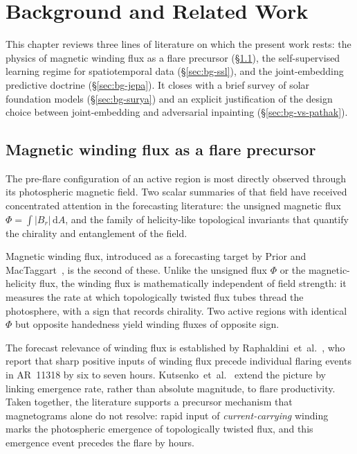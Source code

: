 \chapter{Background and Related Work}
\label{ch:background}

This chapter reviews three lines of literature on which the present
work rests: the physics of magnetic winding flux as a flare
precursor (\S\ref{sec:bg-winding}), the self-supervised learning
regime for spatiotemporal data (\S\ref{sec:bg-ssl}), and the
joint-embedding predictive doctrine
(\S\ref{sec:bg-jepa}). It closes with a brief survey of solar
foundation models (\S\ref{sec:bg-surya}) and an explicit
justification of the design choice between joint-embedding and
adversarial inpainting (\S\ref{sec:bg-vs-pathak}).

\section{Magnetic winding flux as a flare precursor}
\label{sec:bg-winding}

The pre-flare configuration of an active region is most directly
observed through its photospheric magnetic field. Two scalar
summaries of that field have received concentrated attention in the
forecasting literature: the unsigned magnetic flux $\Phi = \int
|B_{r}| \, \mathrm{d}A$, and the family of helicity-like topological
invariants that quantify the chirality and entanglement of the field.

Magnetic winding flux, introduced as a forecasting target by Prior
and MacTaggart~\cite{prior2020helicity}, is the second of these.
Unlike the unsigned flux $\Phi$ or the magnetic-helicity flux, the
winding flux is mathematically independent of field strength: it
measures the rate at which topologically twisted flux tubes thread
the photosphere, with a sign that records chirality. Two active
regions with identical~$\Phi$ but opposite handedness yield winding
fluxes of opposite sign.

The forecast relevance of winding flux is established by
Raphaldini~et~al.~\cite{raphaldini2022winding}, who report that
sharp positive inputs of winding flux precede individual flaring
events in AR~11318 by six to seven hours.
Kutsenko~et~al.~\cite{kutsenko2021flare} extend the picture by
linking emergence rate, rather than absolute magnitude, to flare
productivity. Taken together, the literature supports a precursor
mechanism that magnetograms alone do not resolve: rapid input of
\emph{current-carrying} winding marks the photospheric emergence of
topologically twisted flux, and this emergence event precedes the
flare by hours.

